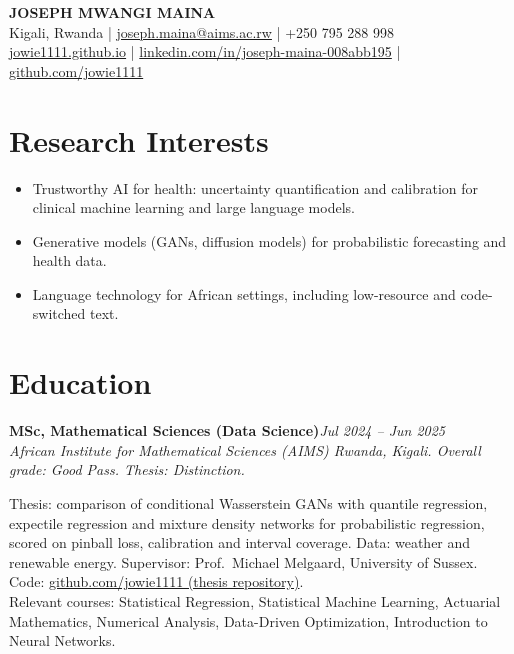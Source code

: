 \documentclass[10pt,a4paper]{article}
\newif\ifwebversion
\newcommand{\entry}[3]{%
  \textbf{#1}\hfill\textit{#2}\\
  \textit{#3}\par\vspace{0.2ex}}
\begin{document}
\begin{center}
  {\LARGE\bfseries JOSEPH MWANGI MAINA}\\[0.6ex]
  Kigali, Rwanda \;|\; \href{mailto:joseph.maina@aims.ac.rw}{joseph.maina@aims.ac.rw}%
  \ifwebversion\else\;|\; +250 795 288 998\fi\\[0.2ex]
  \href{https://jowie1111.github.io}{jowie1111.github.io} \;|\;
  \href{https://www.linkedin.com/in/joseph-maina-008abb195}{linkedin.com/in/joseph-maina-008abb195} \;|\;
  \href{https://github.com/jowie1111}{github.com/jowie1111}
\end{center}
\vspace{-1ex}

\section{Research Interests}
\begin{itemize}
  \item Trustworthy AI for health: uncertainty quantification and calibration for clinical machine learning and large language models.
  \item Generative models (GANs, diffusion models) for probabilistic forecasting and health data.
  \item Language technology for African settings, including low-resource and code-switched text.
\end{itemize}

\section{Education}
\entry{MSc, Mathematical Sciences (Data Science)}{Jul 2024 -- Jun 2025}
{African Institute for Mathematical Sciences (AIMS) Rwanda, Kigali. Overall grade: Good Pass. Thesis: Distinction.}
Thesis: comparison of conditional Wasserstein GANs with quantile regression, expectile regression and mixture density networks for probabilistic regression, scored on pinball loss, calibration and interval coverage. Data: weather and renewable energy. Supervisor: Prof.\ Michael Melgaard, University of Sussex.
Code: \href{https://github.com/jowie1111/Conditional-WGAN-CWGAN-For-Probabilistic-Regression-in-Energy-Consumption-Forecasting}{github.com/jowie1111 (thesis repository)}.\\
Relevant courses: Statistical Regression, Statistical Machine Learning, Actuarial Mathematics, Numerical Analysis, Data-Driven Optimization, Introduction to Neural Networks.
\end{document}
